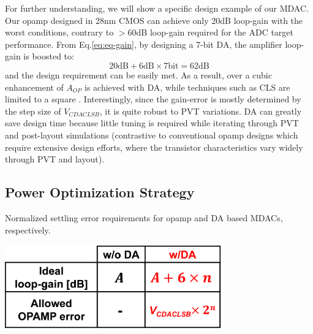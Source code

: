 For further understanding, we will show a specific design example of our MDAC.
Our opamp designed in 28nm CMOS can achieve only 20dB loop-gain with the worst conditions, contrary to $>$60dB loop-gain required for the ADC target performance. From Eq.\ref{eq:eq-gain}, by designing a 7-bit DA, the amplifier loop-gain is boosted to: 
\begin{equation}
    20 \text{dB}+6 \text{dB} \times 7\text{bit}=62 \text{dB}
\end{equation}
and the design requirement can be easily met. As a result, over a cubic enhancement of $A_{OP}$ is achieved with DA, while techniques such as CLS are limited to a square \cite{gregoire2008over}. Interestingly, since the gain-error is mostly determined by the step size of $V_{CDACLSB}$, it is quite robust to PVT variations. %
DA can greatly save design time because little tuning is required while iterating through PVT and post-layout simulations (contrastive to conventional opamp designs which require extensive design efforts, where the transistor characteristics vary widely through PVT and layout).

\subsection{Power Optimization Strategy}
\begin{table}[!]
\centering
  \caption{Normalized settling error requirements for opamp and DA based MDACs, respectively.}
  \label{tbl:da-vs-op}
  \includegraphics[width=0.7\textwidth]{figure/chap2/amp-chara.png}
\end{table}

